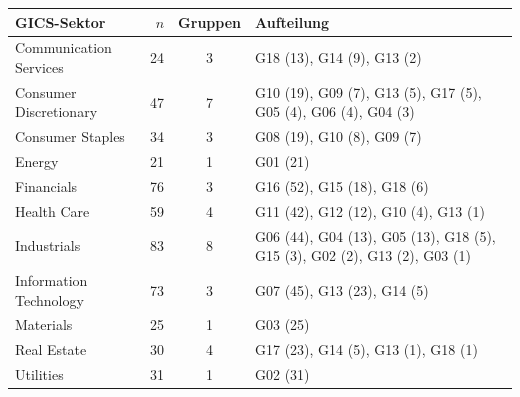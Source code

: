 \begin{tabularx}{\linewidth}{@{}l r c X@{}}
\toprule
GICS-Sektor & $n$ & Gruppen & Aufteilung \\
\midrule
Communication Services & 24 & 3 & {\small G18 (13), G14 (9), G13 (2)} \\
Consumer Discretionary & 47 & 7 & {\small G10 (19), G09 (7), G13 (5), G17 (5), G05 (4), G06 (4), G04 (3)} \\
Consumer Staples & 34 & 3 & {\small G08 (19), G10 (8), G09 (7)} \\
Energy & 21 & 1 & {\small G01 (21)} \\
Financials & 76 & 3 & {\small G16 (52), G15 (18), G18 (6)} \\
Health Care & 59 & 4 & {\small G11 (42), G12 (12), G10 (4), G13 (1)} \\
Industrials & 83 & 8 & {\small G06 (44), G04 (13), G05 (13), G18 (5), G15 (3), G02 (2), G13 (2), G03 (1)} \\
Information Technology & 73 & 3 & {\small G07 (45), G13 (23), G14 (5)} \\
Materials & 25 & 1 & {\small G03 (25)} \\
Real Estate & 30 & 4 & {\small G17 (23), G14 (5), G13 (1), G18 (1)} \\
Utilities & 31 & 1 & {\small G02 (31)} \\
\bottomrule
\end{tabularx}
